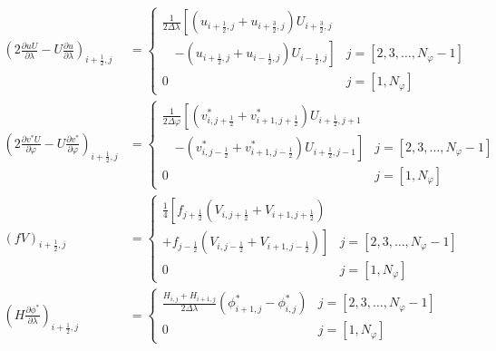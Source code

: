\documentclass{ctexart}
\begin{document}
\begin{align}
  \left( 2 \frac{\partial u U}{\partial \lambda} - U \frac{\partial u}{\partial \lambda} \right)_{i+\frac{1}{2},j} & = \left\{
    \begin{array}{ll}
      \frac{1}{2 \Delta{\lambda}} \left[ \left( u_{i+\frac{1}{2},j} + u_{i+\frac{3}{2},j} \right) U_{i+\frac{3}{2},j} \right. & \\
      \quad \left. - \left( u_{i+\frac{1}{2},j} + u_{i-\frac{1}{2},j} \right) U_{i-\frac{1}{2},j} \right] & j = [2, 3, \dots, N_\varphi - 1] \\
      0 & j = [1, N_\varphi]
    \end{array}
  \right. \\
  \left( 2 \frac{\partial v^* U}{\partial \varphi} - U \frac{\partial v^*}{\partial \varphi} \right)_{i+\frac{1}{2},j} & = \left\{
    \begin{array}{ll}
      \frac{1}{2 \Delta{\varphi}} \left[ \left( v_{i,j+\frac{1}{2}}^* + v_{i+1,j+\frac{1}{2}}^* \right) U_{i+\frac{1}{2},j+1} \right. & \\
      \quad \left. - \left( v_{i,j-\frac{1}{2}}^* + v_{i+1,j-\frac{1}{2}}^* \right) U_{i+\frac{1}{2},j-1} \right] & j = [2, 3, \dots, N_\varphi - 1] \\
      0 & j = [1, N_\varphi]
    \end{array}
  \right. \\
  \left(f V\right)_{i+\frac{1}{2},j} & = \left\{
    \begin{array}{ll}
      \frac{1}{4} \left[ f_{j+\frac{1}{2}} \left( V_{i,j+\frac{1}{2}} + V_{i+1,j+\frac{1}{2}} \right) \right. \\
      \left. + f_{j-\frac{1}{2}} \left( V_{i,j-\frac{1}{2}} + V_{i+1,j-\frac{1}{2}} \right) \right] & j = [2, 3, \dots, N_\varphi - 1] \\
      0 & j = [1, N_\varphi]
    \end{array}
  \right. \\
  \left( H \frac{\partial \phi^*}{\partial \lambda} \right)_{i+\frac{1}{2},j} & = \left\{
    \begin{array}{ll}
      \frac{H_{i,j} + H_{i+1,j}}{2 \Delta{\lambda}} \left( \phi_{i+1,j}^* - \phi_{i,j}^* \right) & j = [2, 3, \dots, N_\varphi - 1] \\
      0 & j = [1, N_\varphi]
    \end{array}
  \right.
\end{align}
\end{document}
